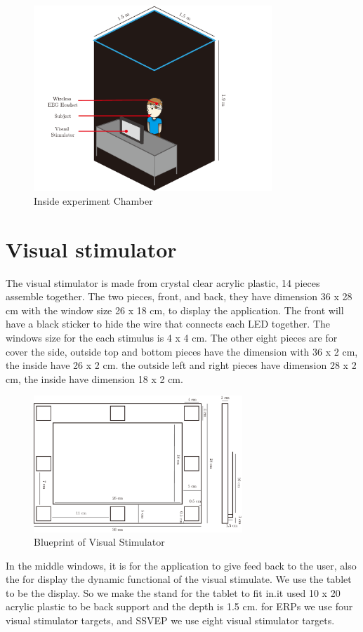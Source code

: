 \\
\begin{figure}[ht]
	\centering
	\includegraphics[width=0.8\textwidth]{chapter6/dark_wire_inside.pdf}
	\caption{Inside experiment Chamber}
\end{figure}

\section{Visual stimulator}

\hspace{1.5cm}The visual stimulator is made from crystal clear acrylic plastic, 14 pieces assemble together. The two pieces, front, and back, they have dimension 36 x 28 cm with the window size 26 x 18 cm, to display the application. The front will have a black sticker to hide the wire that connects each LED together. The windows size for the each stimulus is 4 x 4 cm. The other eight pieces are for cover the side, outside top and bottom pieces have the dimension with 36 x 2 cm, the inside have 26 x 2 cm. the outside left and right pieces have dimension 28 x 2 cm, the inside have dimension 18 x 2  cm.\\

\begin{figure}[ht]
	\centering
	\includegraphics[width=0.7\textwidth]{chapter6/blueprint.pdf}
	\caption{Blueprint of Visual Stimulator}
\end{figure}
In the middle windows, it is for the application to give feed back to the user, also the for display the dynamic functional of the visual stimulate. We use the tablet to be the display. So we make the stand for the tablet to fit in.it used 10 x 20 acrylic plastic to be back support and the depth is 1.5 cm. for ERPs we use four visual stimulator targets, and SSVEP we use eight visual stimulator targets. 



